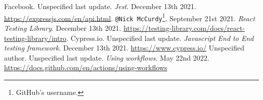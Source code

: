 \documentclass[a4paper, 12pt, oneside]{book}
\begin{document}
\begin{thebibliography}{9}
	Facebook. Unspecified last update. \emph{Jest}. December 13th 2021. \url{https://expressjs.com/en/api.html}.
	\texttt{@Nick McCurdy}\footnote{GitHub's username.}. September 21st 2021. \emph{React Testing Library}. December 13th 2021. \url{https://testing-library.com/docs/react-testing-library/intro}.
	Cypress.io. Unspecified last update. \emph{Javascript End to End testing framework}. December 13th 2021. \url{https://www.cypress.io/}
	Unspecified author. Unspecified last update. \emph{Using workflows}. May 22nd 2022. \url{https://docs.github.com/en/actions/using-workflows}
\end{thebibliography}
\end{document}
